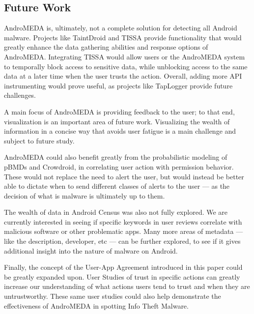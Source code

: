 \documentclass{acm_proc_article-sp}
\begin{document}
\subsection{Future Work}
\label{sec:futurework}
AndroMEDA is, ultimately, not a complete solution for detecting all Android malware. Projects like TaintDroid and TISSA provide functionality that would greatly enhance the data gathering abilities and response options of AndroMEDA. Integrating TISSA would allow users or the AndroMEDA system to temporally block access to sensitive data, while unblocking access to the same data at a later time when the user trusts the action. Overall, adding more API instrumenting would prove useful, as projects like TapLogger provide future challenges.

A main focus of AndroMEDA is providing feedback to the user; to that end, visualization is an important area of future work. Visualizing the wealth of information in a concise way that avoids user fatigue is a main challenge and subject to future study.

AndroMEDA could also benefit greatly from the probabilistic modeling of pBMDs and Crowdroid, in correlating user action with permission behavior. These would not replace the need to alert the user, but would instead be better able to dictate when to send different classes of alerts to the user --- as the decision of what is malware is ultimately up to them.

The wealth of data in Android Census was also not fully explored. We are currently interested in seeing if specific keywords in user reviews correlate with malicious software or other problematic apps. Many more areas of metadata --- like the description, developer, etc --- can be further explored, to see if it gives additional insight into the nature of malware on Android.

Finally, the concept of the User-App Agreement introduced in this paper could be greatly expanded upon. User Studies of trust in specific actions can greatly increase our understanding of what actions users tend to trust and when they are untrustworthy. These same user studies could also help demonstrate the effectiveness of AndroMEDA in spotting Info Theft Malware.
\end{document}

